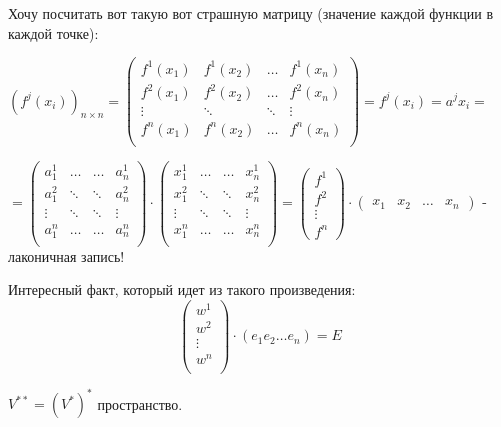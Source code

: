 Хочу посчитать вот такую вот страшную матрицу (значение каждой функции в каждой точке):

$(f^j(x_i))_{n\times n} = \begin{pmatrix}
    f^1(x_1) & f^1(x_2) & \dots & f^1(x_n)\\
    f^2(x_1) & f^2(x_2) & \dots & f^2(x_n)\\
    \vdots & \ddots & \ddots & \vdots \\
    f^n(x_1) & f^n(x_2) & \dots & f^n(x_n)\\
\end{pmatrix} = f^j(x_i)= a^j x_i  = $


$=\begin{pmatrix}
    a_1^1 & \ldots & \ldots& a^1_n\\ 
     a_1^2 & \ddots & \ddots& a^2_n\\ 
      \vdots & \ddots & \ddots& \vdots\\ 
      a_1^n & \ldots & \ldots& a^n_n\\ 
\end{pmatrix} \cdot\begin{pmatrix}
    x_1^1 & \ldots & \ldots& x^1_n\\ 
     x_1^2 & \ddots & \ddots& x^2_n\\ 
      \vdots & \ddots & \ddots& \vdots\\ 
      x_1^n & \ldots & \ldots& x^n_n\\ 
\end{pmatrix} = \begin{pmatrix}
    f^1\\
    f^2\\
    \vdots\\
    f^n
\end{pmatrix} \cdot \begin{pmatrix}
    x_1 & x_2 & \ldots & x_n
\end{pmatrix}$ - лаконичная запись!



Интересный факт, который идет из такого произведения:
$$\begin{pmatrix}
    w^1 \\
    w^2 \\
    \vdots \\
    w^n \\
\end{pmatrix} \cdot (e_1e_2 \dots e_n) = E $$

 $V^{**} = (V^*)^*$  пространство.

